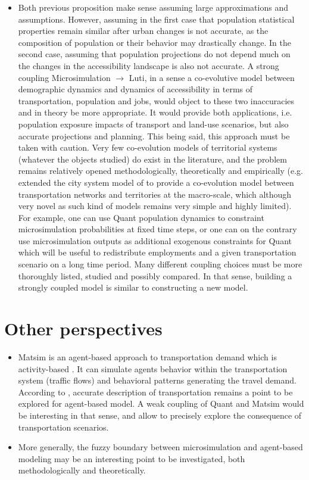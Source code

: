 \begin{itemize}
	\item Both previous proposition make sense assuming large approximations and assumptions. However, assuming in the first case that population statistical properties remain similar after urban changes is not accurate, as the composition of population or their behavior may drastically change. In the second case, assuming that population projections do not depend much on the changes in the accessibility landscape is also not accurate. A strong coupling Microsimulation $\rightarrow$ Luti, in a sense a co-evolutive model between  demographic dynamics and dynamics of accessibility in terms of transportation, population and jobs, would object to these two inaccuracies and in theory be more appropriate. It would provide both applications, i.e. population exposure impacts of transport and land-use scenarios, but also accurate projections and planning. This being said, this approach must be taken with caution. Very few co-evolution models of territorial systems (whatever the objects studied) do exist in the literature, and the problem remains relatively opened methodologically, theoretically and empirically (e.g. \cite{raimbault2018modeling} extended the city system model of \cite{raimbault2018indirect} to provide a co-evolution model between transportation networks and territories at the macro-scale, which although very novel as such kind of models remains very simple and highly limited). For example, one can use Quant population dynamics to constraint microsimulation probabilities at fixed time steps, or one can on the contrary use microsimulation outputs as additional exogenous constraints for Quant which will be useful to redistribute employments and a given transportation scenario on a long time period. Many different coupling choices must be more thoroughly listed, studied and possibly compared. In that sense, building a strongly coupled model is similar to constructing a new model.
\end{itemize}


\section{Other perspectives}


\begin{itemize}
	\item Matsim is an agent-based approach to transportation demand which is activity-based \cite{horni2016multi}. It can simulate agents behavior within the transportation system (traffic flows) and behavioral patterns generating the travel demand. According to \cite{wise2016transportation}, accurate description of transportation remains a point to be explored for agent-based model. A weak coupling of Quant and Matsim would be interesting in that sense, and allow to precisely explore the consequence of transportation scenarios.
	\item More generally, the fuzzy boundary between microsimulation and agent-based modeling may be an interesting point to be investigated, both methodologically and theoretically.
\end{itemize}










